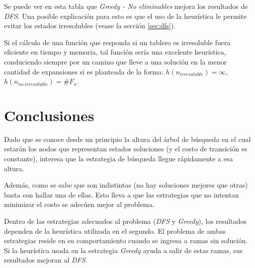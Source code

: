 \documentclass[a4paper,10pt]{article}
\begin{document}
    Se puede ver en esta tabla que \textit{Greedy - No eliminables} mejora los resultados de \textit{DFS}.
    Una posible explicación para esto es que el uso de la heurística le permite evitar los estados irresolubles (vease la sección \ref{sec:dfs}).

    Si el cálculo de una función que responda si un tablero es irresoluble fuera eficiente en tiempo y memoria, tal función sería una excelente heurística, conduciendo siempre por un camino que lleve a una solución en la menor cantidad de expansiones si es planteada de la forma: $h(n_{irresoluble}) = \infty$, $h(n_{no\ irresoluble}) = \#F_n$.

\section{Conclusiones}
    Dado que se conoce desde un principio la altura del árbol de búsqueda en el cual estarán los nodos que representan estados soluciones (y el costo de transición es constante), interesa que la estrategia de búsqueda llegue rápidamente a esa altura.

    Además, como se sabe que son indistintas (no hay soluciones mejores que otras) basta con hallar una de ellas. Esto lleva a que las estrategias que no intentan minimizar el costo se adecúen mejor al problema.

    Dentro de las estrategias adecuados al problema (\textit{DFS} y \textit{Greedy}), los resultados dependen de la heurística utilizada en el segundo. El problema de ambas estrategias reside en su comportamiento cuando se ingresa a ramas sin solución.  Si la heurística usada en la estrategia \textit{Greedy} ayuda a salir de estas ramas, sus resultados mejoran al \textit{DFS}.


\end{document}
